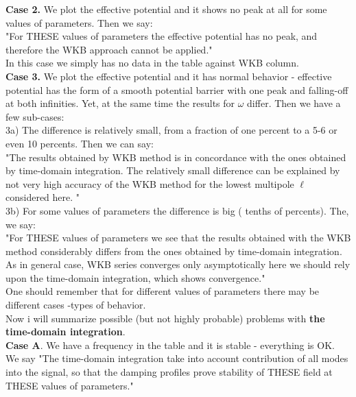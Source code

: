 \documentclass[10pt]{article}
\begin{document}
\textbf{Case 2.} We plot the effective potential and it shows no peak at all for some values of parameters. Then we say:\\

"For THESE values of parameters the effective potential has no peak, and therefore the WKB approach cannot be applied."\\

In this case we simply has no data in the table against WKB column.\\

\textbf{Case 3.} We plot the effective potential and it has normal behavior - effective potential has the form of a smooth potential barrier with one peak and falling-off at both infinities. Yet, at the same time the results for $\omega$ differ. Then we have a few sub-cases: \\

3a) The difference is relatively small, from a fraction of one percent to a 5-6 or even 10 percents. Then we can say:\\

"The results obtained by WKB method is in concordance with the ones obtained by time-domain integration. The relatively small difference can be explained by not very high accuracy of the WKB method for the lowest multipole $\ell$ considered here. "\\

3b) For some values of parameters the difference is big ( tenths of percents). The, we say:\\

"For THESE values of parameters we see that the results obtained with the WKB method considerably differs from the ones obtained by time-domain integration. As in general case, WKB series converges only asymptotically here we should rely upon the time-domain integration, which shows convergence."\\

One should remember that for different values of parameters there may be different cases -types of behavior.\\

Now i will summarize possible (but not highly probable) problems with \textbf{the time-domain integration}.\\

\textbf{Case A}. We have a frequency in the table and it is stable - everything is OK. We say "The time-domain integration take into account contribution of all modes into the signal, so that the damping profiles prove stability of THESE field at THESE values of parameters."\\
\end{document}

